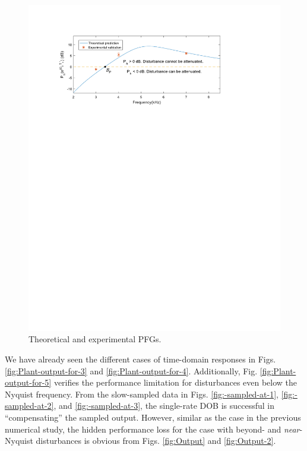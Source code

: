 \documentclass [11pt, proquest] {uwthesis}[2020/02/24]
\begin{document}
\begin{figure}[!ht]
\begin{centering}
\includegraphics[width=14cm]{Spectral-analysis/FIG17.pdf}
\par\end{centering}
\caption{\label{fig:Theoretical-and-experimental}Theoretical and experimental
PFGs.}
\end{figure}

We have already seen the different cases of time-domain responses
in Figs. \ref{fig:Plant-output-for-3} and \ref{fig:Plant-output-for-4}.
Additionally, Fig. \ref{fig:Plant-output-for-5} verifies the performance
limitation for disturbances even below the Nyquist frequency. From
the slow-sampled data in Figs. \ref{fig:-sampled-at-1}, \ref{fig:-sampled-at-2},
and \ref{fig:-sampled-at-3}, the single-rate DOB is successful in
``compensating'' the sampled output. However, similar as the case
in the previous numerical study, the hidden performance loss for the
case with beyond- and \emph{near}-Nyquist disturbances is obvious
from Figs. \ref{fig:Output} and \ref{fig:Output-2}.
\end{document}
